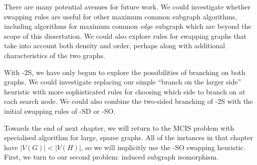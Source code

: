 There are many potential avenues for future work.  We could investigate
whether swapping rules are useful for other maximum common subgraph algorithms, including
algorithms for maximum common \emph{edge} subgraph which are beyond the scope of this
dissertation.
We could also explore rules for swapping graphs that take into account both density and order,
perhaps along with additional characteristics of the two graphs.

With \McSplit-2S, we have only begun to explore the possibilities of branching on both graphs.
We could investigate replacing our simple ``branch on the larger side'' heuristic with more
sophisticated rules for choosing which side to branch on at each search node.  We could also
combine the two-sided branching of \McSplit-2S with the initial swapping rules of \McSplit-SD
or \McSplit-SO.

Towards the end of next chapter, we will return to the MCIS problem with
specialised algorithm for large, sparse graphs.  All of the instances in that
chapter have $|V(G)| < |V(H)|$, so we will implicitly use the \McSplit-SO
swapping heuristic. First, we turn to our second problem: induced subgraph
isomorphism.
